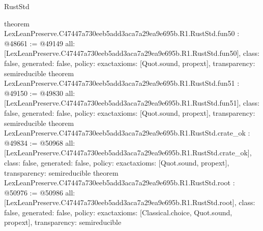\begin{lexlean}{RustStd}
\begin{coremodule}
{}
theorem LexLeanPreserve.C47447a730eeb5add3aca7a29ea9e695b.R1.RustStd.fun50 : @48661 := @49149 {
  all: [LexLeanPreserve.C47447a730eeb5add3aca7a29ea9e695b.R1.RustStd.fun50],
  class: false,
  generated: false,
  policy: exact{axioms: [Quot.sound, propext]},
  transparency: semireducible
}
theorem LexLeanPreserve.C47447a730eeb5add3aca7a29ea9e695b.R1.RustStd.fun51 : @49150 := @49830 {
  all: [LexLeanPreserve.C47447a730eeb5add3aca7a29ea9e695b.R1.RustStd.fun51],
  class: false,
  generated: false,
  policy: exact{axioms: [Quot.sound, propext]},
  transparency: semireducible
}
theorem LexLeanPreserve.C47447a730eeb5add3aca7a29ea9e695b.R1.RustStd.crate_ok : @49834 := @50968 {
  all: [LexLeanPreserve.C47447a730eeb5add3aca7a29ea9e695b.R1.RustStd.crate_ok],
  class: false,
  generated: false,
  policy: exact{axioms: [Quot.sound, propext]},
  transparency: semireducible
}
theorem LexLeanPreserve.C47447a730eeb5add3aca7a29ea9e695b.R1.RustStd.root : @50976 := @50986 {
  all: [LexLeanPreserve.C47447a730eeb5add3aca7a29ea9e695b.R1.RustStd.root],
  class: false,
  generated: false,
  policy: exact{axioms: [Classical.choice, Quot.sound, propext]},
  transparency: semireducible
}


\end{coremodule}
\end{lexlean}
